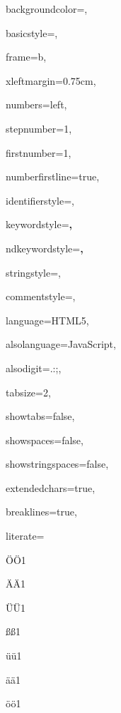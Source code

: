 \documentclass[master,english]{hgbthesis}
\begin{document}
 {%


  backgroundcolor=\color{editorGray},

  basicstyle={\footnotesize\ttfamily},   

  frame=b,


  xleftmargin={0.75cm},

  numbers=left,

  stepnumber=1,

  firstnumber=1,

  numberfirstline=true,	


  identifierstyle=\color{black},

  keywordstyle=\color{blue}\bfseries,

  ndkeywordstyle=\color{editorGreen}\bfseries,

  stringstyle=\color{editorOcher}\ttfamily,

  commentstyle=\color{brown}\ttfamily,


  language=HTML5,

  alsolanguage=JavaScript,

  alsodigit={.:;},	

  tabsize=2,

  showtabs=false,

  showspaces=false,

  showstringspaces=false,

  extendedchars=true,

  breaklines=true,


  literate=%

  {Ö}{{\"O}}1

  {Ä}{{\"A}}1

  {Ü}{{\"U}}1

  {ß}{{\ss}}1

  {ü}{{\"u}}1

  {ä}{{\"a}}1

  {ö}{{\"o}}1

}
\end{document}
